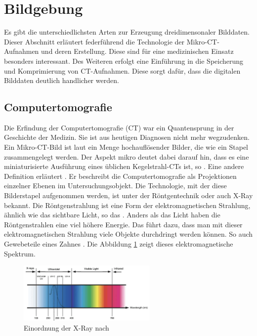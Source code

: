 \section{Bildgebung}
\label{sec:technologisch} Es gibt die unterschiedlichsten Arten zur Erzeugung
dreidimensonaler Bilddaten. Dieser Abschnitt erläutert federführend die Technologie
der Mikro-\ac{CT}-Aufnahmen und deren Erstellung. Diese sind für eine medizinischen
Einsatz besonders interessant. Des Weiteren erfolgt eine Einführung in die
Speicherung und Komprimierung von \ac{CT}-Aufnahmen. Diese sorgt dafür, dass die
digitalen Bilddaten deutlich handlicher werden.

\subsection{Computertomografie}
\label{subsec:computertomografie} Die Erfindung der Computertomografie (\ac{CT})
war ein Quantensprung in der Geschichte der Medizin. Sie ist aus heutigen Diagnosen
nicht mehr wegzudenken. Ein Mikro-\ac{CT}-Bild ist laut \citet[Abstract]{baird2017}
ein Menge hochauflösender Bilder, die wie ein Stapel zusammengelegt werden. Der Aspekt
mikro deutet dabei darauf hin, dass es eine miniaturisierte Ausführung eines
üblichen Kegelstrahl-\ac{CT}s ist, so \citet[S.~340]{buzug2011}. Eine andere Definition
erläutert \citet{lehmann2013bildverarbeitung}. Er beschreibt die Computertomografie
als Projektionen einzelner Ebenen im Untersuchungsobjekt. Die Technologie, mit der
diese Bilderstapel aufgenommen werden, ist unter der Röntgentechnik oder auch
\ac{X-Ray} bekannt. Die Röntgenstrahlung ist eine Form der elektromagnetischen
Strahlung, ähnlich wie das sichtbare Licht, so das \citet[K.~1]{nib2024}. Anders
als das Licht haben die Röntgenstrahlen eine viel höhere Energie. Das führt dazu,
dass man mit dieser elektromagnetischen Strahlung viele Objekte durchdringt
werden können. So auch Gewebeteile eines Zahnes \citep[vgl.][K.~1]{nib2024}. Die
Abbildung \ref{fig:spectrum} zeigt dieses elektromagnetische Spektrum.

\begin{figure}[h]
	\centering
	\includegraphics[width=0.6\textwidth]{img/x_ray.jpg}
	\caption{Einordnung der \ac{X-Ray} nach \citet{zwinkels2015}}
	\label{fig:spectrum}
\end{figure}

